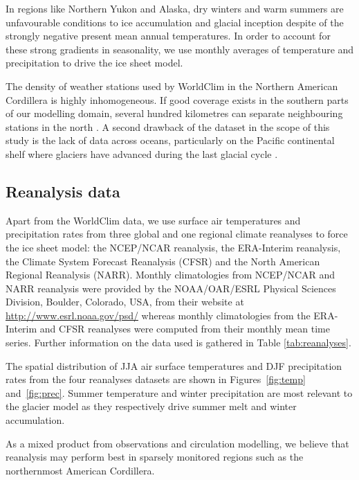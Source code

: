 In regions like Northern Yukon and Alaska, dry winters and warm summers are unfavourable conditions to ice accumulation and glacial inception despite of the strongly negative present mean annual temperatures. In order to account for these strong gradients in seasonality, we use monthly averages of temperature and precipitation to drive the ice sheet model.

The density of weather stations used by WorldClim in the Northern American Cordillera is highly inhomogeneous. If good coverage exists in the southern parts of our modelling domain, several hundred kilometres can separate neighbouring stations in the north \citep{data:worldclim}. A second drawback of the dataset in the scope of this study is the lack of data across oceans, particularly on the Pacific continental shelf where glaciers have advanced during the last glacial cycle \citep{jackson-clague-1991}.


\subsection{Reanalysis data}

Apart from the WorldClim data, we use surface air temperatures and precipitation rates from three global and one regional climate reanalyses to force the ice sheet model: the NCEP/NCAR reanalysis, the ERA-Interim reanalysis, the Climate System Forecast Reanalysis (CFSR) and the North American Regional Reanalysis (NARR). Monthly climatologies from NCEP/NCAR and NARR reanalysis were provided by the NOAA/OAR/ESRL Physical Sciences Division, Boulder, Colorado, USA, from their website at \url{http://www.esrl.noaa.gov/psd/} whereas monthly climatologies from the ERA-Interim and CFSR reanalyses were computed from their monthly mean time series. Further information on the data used is gathered in Table \ref{tab:reanalyses}.

The spatial distribution of JJA air surface temperatures and DJF precipitation rates from the four reanalyses datasets are shown in Figures~\ref{fig:temp} and~\ref{fig:prec}. Summer temperature and winter precipitation are most relevant to the glacier model as they respectively drive summer melt and winter accumulation.

As a mixed product from observations and circulation modelling, we believe that reanalysis may perform best in sparsely monitored regions such as the northernmost American Cordillera.

